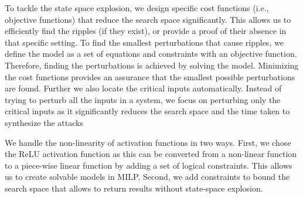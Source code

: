 To tackle the state space explosion, we design \attack specific cost functions (i.e., objective functions) that reduce the search space significantly. This allows us to efficiently find the ripples (if they exist), or provide a proof of their absence in that specific setting. To find the smallest perturbations that cause  ripples, we define the model as a set of equations and constraints with an objective function. Therefore, finding the perturbations is achieved by solving the model. Minimizing the cost functions provides an assurance that the smallest possible perturbations are found. %
Further we also locate the critical inputs automatically. Instead of trying to perturb all the inputs in a system, we focus on perturbing only the critical %
inputs as it significantly reduces the search space and the time taken to synthesize the attacks %

We handle the non-linearity of activation functions in two ways. First, we chose the ReLU activation function as this can be converted from a non-linear function to a piece-wise linear function by adding a set of logical constraints. This allows us to create solvable models in MILP. Second, we add constraints to bound the search space that allows \tool to return results without state-space explosion. %



